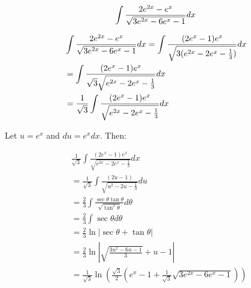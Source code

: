 \[
\int \frac{2 e^{2 x}-e^x}{\sqrt{3 e^{2 x}-6 e^x-1}} d x \\
\]

\[
\begin{aligned}
& \int \frac{2 e^{2 x}-e^x}{\sqrt{3 e^{2 x}-6 e^x-1}} d x = \int \frac{(2 e^x-1) e^x}{\sqrt{3(e^{2 x}-2 e^x-\frac{1}{3})}} d x \\
& = \int \frac{(2 e^x-1) e^x}{\sqrt{3} \sqrt{e^{2 x}-2 e^x-\frac{1}{3}}} d x \\
& = \frac{1}{\sqrt{3}} \int \frac{(2 e^x-1) e^x}{\sqrt{e^{2 x}-2 e^x-\frac{1}{3}}} d x \\
\end{aligned}\\
\]

Let $u=e^x$ and $du=e^x dx$. Then:

\[
\begin{aligned}
& \frac{1}{\sqrt{3}} \int \frac{(2 e^x-1) e^x}{\sqrt{e^{2 x}-2 e^x-\frac{1}{3}}} d x \\
& = \frac{1}{\sqrt{3}} \int \frac{(2 u-1)}{\sqrt{u^2-2 u-\frac{1}{3}}} du \\
& = \frac{2}{3} \int \frac{\sec \theta \tan \theta}{\sqrt{\tan^2 \theta}} d \theta \\
& = \frac{2}{3} \int \sec \theta d \theta \\
& = \frac{2}{3} \ln \left|\sec \theta + \tan \theta\right| \\
& = \frac{2}{3} \ln \left|\sqrt{\frac{3 u^2-6u-1}{3}}+u-1\right| \\
& = \frac{1}{\sqrt{3}} \ln \left(\frac{\sqrt{3}}{2}\left(e^x-1+\frac{1}{\sqrt{3}} \sqrt{3 e^{2 x}-6 e^x-1}\right)\right) \\
\end{aligned}
\]
